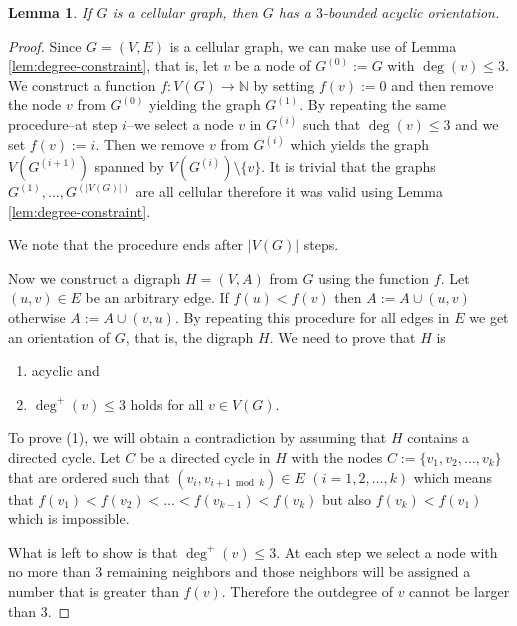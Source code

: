 \documentclass[a4paper, 12pt]{article}
\newtheorem{lem}{Lemma}[section]
\begin{document}
\begin{lem}\label{lem:bounded-acyclic-orientation}
If $G$ is a cellular graph, then $G$ has a $3$-bounded acyclic orientation.
\end{lem}
\begin{proof} Since $G=(V,E)$ is a cellular graph, we can make use of Lemma \ref{lem:degree-constraint}, that is, let $v$ be a node of $G^{(0)}:=G$ with $\deg(v) \leqslant 3$. We construct a function $f\colon V(G) \to \mathbb{N}$ by setting $f(v) := 0$ and then remove the node $v$ from $G^{(0)}$ yielding the graph $G^{(1)}$. By repeating the same procedure\---at step $i$\---we select a node $v$ in $G^{(i)}$ such that $\deg(v) \leqslant 3$ and we set $f(v):=i$. Then we remove $v$ from $G^{(i)}$ which yields the graph $V(G^{(i+1)})$ spanned by $V(G^{(i)}) \setminus \lbrace v \rbrace$. It is trivial that the graphs $G^{(1)},\ldots,G^{(|V(G)|)}$ are all cellular therefore it was valid using Lemma \ref{lem:degree-constraint}.

We note that the procedure ends after $|V(G)|$ steps.

Now we construct a digraph $H=(V,A)$ from $G$ using the function $f$. Let $(u,v) \in E$ be an arbitrary edge. If $f(u) < f(v)$ then $A:=A\cup (u,v)$ otherwise $A:=A \cup (v,u)$. By repeating this procedure for all edges in $E$ we get an orientation of $G$, that is, the digraph $H$. We need to prove that $H$ is
\begin{enumerate}
\item acyclic and
\item $\deg^+(v) \leqslant 3$ holds for all $v \in V(G)$.
\end{enumerate}
To prove (1), we will obtain a contradiction by assuming that $H$ contains a directed cycle. Let $C$ be a directed cycle in $H$ with the nodes $C:=\lbrace v_1,v_2,\ldots,v_k \rbrace$ that are ordered such that $(v_i,v_{i+1 \bmod{k}}) \in E$ $(i=1,2,\ldots,k)$ which means that $f(v_1) < f(v_2) < \ldots < f(v_{k-1}) < f(v_k)$ but also $f(v_k) < f(v_1)$ which is impossible.

What is left to show is that $\deg^+(v) \leqslant 3$. At each step we select a node with no more than $3$ remaining neighbors and those neighbors will be assigned a number that is greater than $f(v)$. Therefore the outdegree of $v$ cannot be larger than $3$.
\end{proof}
\end{document}
